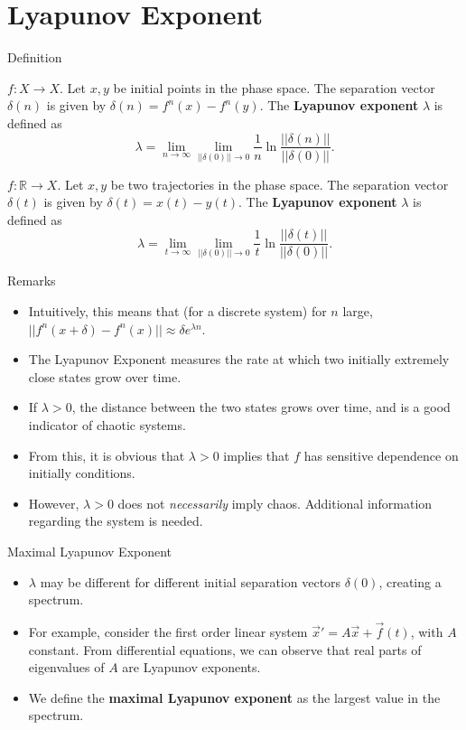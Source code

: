 \documentclass[aspectratio=169]{beamer}
\begin{document}
\section{Lyapunov Exponent}
\frame{\sectionpage}

\begin{frame}{Definition}
    \begin{defn}
        $f:X\rightarrow X$. Let $x,y$ be initial points in the phase space. The separation vector $\delta(n)$ is given by $\delta(n) = f^n(x)-f^n(y)$. The \textbf{Lyapunov exponent} $\lambda$ is defined as $$\lambda = \displaystyle \lim_{n\rightarrow \infty} \lim_{||\delta(0)||\rightarrow 0} \frac{1}{n} \ln{\frac{||\delta(n)||}{||\delta(0)||}}.$$
    \end{defn}
    \begin{defn}
        $f:\mathbb{R}\rightarrow X$. Let $x,y$ be two trajectories in the phase space. The separation vector $\delta(t)$ is given by $\delta(t) = x(t)-y(t)$. The \textbf{Lyapunov exponent} $\lambda$ is defined as $$\lambda = \displaystyle \lim_{t\rightarrow \infty} \lim_{||\delta(0)||\rightarrow 0} \frac{1}{t} \ln{\frac{||\delta(t)||}{||\delta(0)||}}.$$
    \end{defn}
\end{frame}

\begin{frame}{Remarks}
    \begin{itemize}
        \item Intuitively, this means that (for a discrete system) for $n$ large, $||f^n(x+\delta)-f^n(x)|| \approx \delta e^{\lambda n}$. 
        \item The Lyapunov Exponent measures the rate at which two initially extremely close states grow over time.
        \item If $\lambda > 0$, the distance between the two states grows over time, and is a good indicator of chaotic systems.
        \item From this, it is obvious that $\lambda>0$ implies that $f$ has sensitive dependence on initially conditions.
        \item However, $\lambda>0$ does not \textit{necessarily} imply chaos. Additional information regarding the system is needed. 
    \end{itemize}
\end{frame}

\begin{frame}{Maximal Lyapunov Exponent}
    \begin{itemize}
        \item $\lambda$ may be different for different initial separation vectors $\delta(0)$, creating a spectrum.
        \item For example, consider the first order linear system $\vec{x}'=A\vec{x}+\vec{f}(t)$, with $A$ constant. From differential equations, we can observe that real parts of eigenvalues of $A$ are Lyapunov exponents. 
        \item We define the \textbf{maximal Lyapunov exponent} as the largest value in the spectrum. 
    \end{itemize}
\end{frame}
\end{document}
